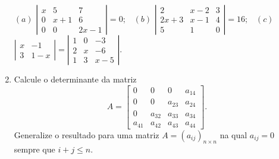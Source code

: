 \documentclass{report}
\begin{document}
\begin{Exercise}
\begin{enumerate}
$(a)$ $ \left|
\begin{array}{ccc}
x & 5 & 7 \\
0 & x+1 & 6 \\
0 & 0 & 2x-1
\end{array}
\right| =0;$ \ $(b)$ $ \left|
\begin{array}{ccc}
2 & x-2 & 3 \\
2x+3 & x-1 & 4 \\
5 & 1 & 0
\end{array}
\right| =16;$ \ $(c)$ $ \left|
\begin{array}{cc}
x & -1 \\
3 & 1-x
\end{array}
\right| =\left|
\begin{array}{ccc}
1 & 0 & -3 \\
2 & x & -6 \\
1 & 3 & x-5
\end{array}
\right|.$






\item \label{1lista35}  Calcule o determinante da matriz
$$
A=\left[
\begin{array}{cccc}
0 & 0 & 0 & a_{14} \\
0 & 0 & a_{23} & a_{24} \\
0 & a_{32} & a_{33} & a_{34} \\
a_{41} & a_{42} & a_{43} & a_{44}
\end{array}
\right].$$ Generalize o resultado para uma matriz $A = ( a_{ij})
_{n\times n}$ na qual $a_{ij}=0$ sempre que $i+j\leq n$.




\end{enumerate}
\end{Exercise}
\end{document}
